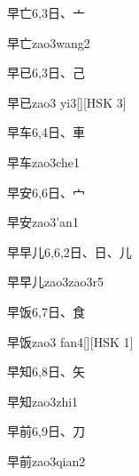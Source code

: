 \begin{Entry}{早亡}{6,3}{⽇、⼇}
  \begin{Phonetics}{早亡}{zao3wang2}
  \end{Phonetics}
\end{Entry}

\begin{Entry}{早已}{6,3}{⽇、⼰}
  \begin{Phonetics}{早已}{zao3 yi3}[][HSK 3]
  \end{Phonetics}
\end{Entry}

\begin{Entry}{早车}{6,4}{⽇、⾞}
  \begin{Phonetics}{早车}{zao3che1}
  \end{Phonetics}
\end{Entry}

\begin{Entry}{早安}{6,6}{⽇、⼧}
  \begin{Phonetics}{早安}{zao3'an1}
  \end{Phonetics}
\end{Entry}

\begin{Entry}{早早儿}{6,6,2}{⽇、⽇、⼉}
  \begin{Phonetics}{早早儿}{zao3zao3r5}
  \end{Phonetics}
\end{Entry}

\begin{Entry}{早饭}{6,7}{⽇、⾷}
  \begin{Phonetics}{早饭}{zao3 fan4}[][HSK 1]
  \end{Phonetics}
\end{Entry}

\begin{Entry}{早知}{6,8}{⽇、⽮}
  \begin{Phonetics}{早知}{zao3zhi1}
  \end{Phonetics}
\end{Entry}

\begin{Entry}{早前}{6,9}{⽇、⼑}
  \begin{Phonetics}{早前}{zao3qian2}
  \end{Phonetics}
\end{Entry}

